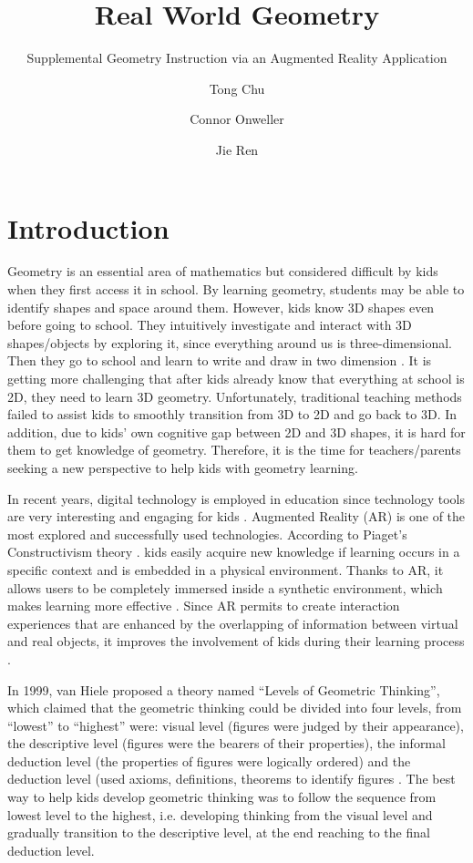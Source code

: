 \documentclass[acmsmall, nonacm]{acmart}
\title{Real World Geometry}
\subtitle{Supplemental Geometry Instruction via an Augmented Reality Application}
\author{Tong Chu}
\author{Connor Onweller}
\author{Jie Ren}
\begin{document}
\maketitle

\section{Introduction}
\label{sec:introduction}

Geometry is an essential area of mathematics but considered difficult by kids
when they first access it in school.  By learning geometry, students may be able
to identify shapes and space around them.  However, kids know 3D shapes even
before going to school.  They intuitively investigate and interact with 3D
shapes/objects by exploring it, since everything around us is three-dimensional.
Then they go to school and learn to write and draw in two dimension
\cite{AR-3D-geometry}.  It is getting more challenging that after kids already
know that everything at school is 2D, they need to learn 3D geometry.
Unfortunately, traditional teaching methods failed to assist kids to smoothly
transition from 3D to 2D and go back to 3D.  In addition, due to kids’ own
cognitive gap between 2D and 3D shapes, it is hard for them to get knowledge of
geometry.  Therefore, it is the time for teachers/parents seeking a new
perspective to help kids with geometry learning.

In recent years, digital technology is employed in education since technology
tools are very interesting and engaging for kids \cite{game-based,
using-games-learning, game-based-learning, adaptive}. Augmented Reality (AR) is
one of the most explored and successfully used technologies.  According to
Piaget’s Constructivism theory \cite{psych-child}.  kids easily acquire new
knowledge if learning occurs in a specific context and is embedded in a physical
environment.  Thanks to AR, it allows users to be completely immersed inside a
synthetic environment, which makes learning more effective
\cite{situated-learning}.  Since AR permits to create interaction experiences
that are enhanced by the overlapping of information between virtual and real
objects, it improves the involvement of kids during their learning process
\cite{AR-support-geometry}.

In 1999, van Hiele proposed a theory named “Levels of Geometric Thinking”, which
claimed that the geometric thinking could be divided into four levels, from
“lowest” to “highest” were: visual level (figures were judged by their
appearance), the descriptive level (figures were the bearers of their
properties), the informal deduction level (the properties of figures were
logically ordered) and the deduction level (used axioms, definitions, theorems
to identify figures \cite{developing-geometric-thinking}.  The best way to help
kids develop geometric thinking was to follow the sequence from lowest level to
the highest, i.e. developing thinking from the visual level and gradually
transition to the descriptive level, at the end reaching to the final deduction
level.
\end{document}
